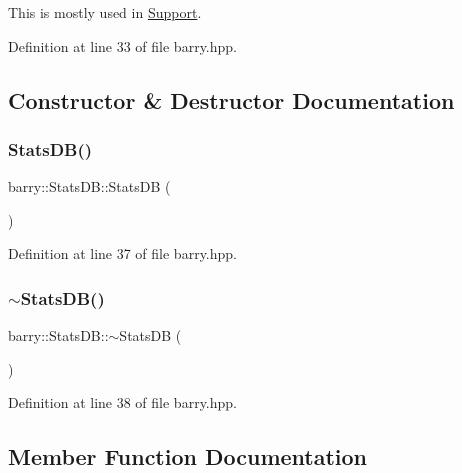 This is mostly used in {\ttfamily \hyperlink{classbarry_1_1_support}{Support}}. 

Definition at line 33 of file barry.\+hpp.



\subsection{Constructor \& Destructor Documentation}
\mbox{\label{classbarry_1_1_stats_d_b_a917ba8ccacb9dce050c481eb8a6d3c22}} 
\subsubsection{\texorpdfstring{Stats\+D\+B()}{StatsDB()}}
{\footnotesize\ttfamily barry\+::\+Stats\+D\+B\+::\+Stats\+DB (\begin{DoxyParamCaption}{ }\end{DoxyParamCaption})\hspace{0.3cm}{\ttfamily [inline]}}



Definition at line 37 of file barry.\+hpp.

\mbox{\label{classbarry_1_1_stats_d_b_a7d511a6eeeae101e18ae47ca616ad204}} 
\subsubsection{\texorpdfstring{$\sim$\+Stats\+D\+B()}{~StatsDB()}}
{\footnotesize\ttfamily barry\+::\+Stats\+D\+B\+::$\sim$\+Stats\+DB (\begin{DoxyParamCaption}{ }\end{DoxyParamCaption})\hspace{0.3cm}{\ttfamily [inline]}}



Definition at line 38 of file barry.\+hpp.



\subsection{Member Function Documentation}
\mbox{\label{classbarry_1_1_stats_d_b_a8f2d22df8ecf8f12bc54157e86d34696}} 
